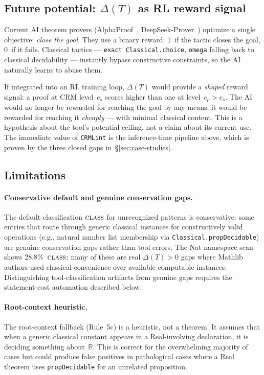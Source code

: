 \documentclass[12pt, a4paper]{article}
\theoremstyle{plain}
\theoremstyle{definition}
\theoremstyle{remark}
\newcommand{\CLASS}{\textsc{class}}
\newcommand{\CRMLint}{\texttt{CRMLint}}
\begin{document}
\subsection{Future potential: $\Delta(T)$ as RL reward signal}

Current AI theorem provers (AlphaProof~\cite{alphaproof},
DeepSeek-Prover~\cite{deepseek}) optimize a single objective:
\emph{close the goal}.  They use a binary reward: 1~if the tactic
closes the goal, 0~if it fails.  Classical tactics ---
\texttt{exact Classical.choice}, \texttt{omega} falling back to
classical decidability --- instantly bypass constructive constraints,
so the AI naturally learns to abuse them.

If integrated into an RL training loop, $\Delta(T)$ would provide a
\emph{shaped} reward signal: a proof at CRM level~$c_s$ scores
higher than one at level~$c_p > c_s$.  The AI would no longer be
rewarded for reaching the goal by any means; it would be rewarded
for reaching it \emph{cheaply} --- with minimal classical content.
This is a hypothesis about the tool's potential ceiling, not a
claim about its current use.  The immediate value of \CRMLint{} is
the inference-time pipeline above, which is proven by the three
closed gaps in~\S\ref{sec:case-studies}.

\subsection{Limitations}

\paragraph{Conservative default and genuine conservation gaps.}
The default classification $\CLASS$ for unrecognized patterns
is conservative: some entries that route through generic classical
instances for constructively valid operations (e.g., natural number
list membership via \texttt{Classical.propDecidable}) are genuine
conservation gaps rather than tool errors.  The Nat namespace scan
shows 28.8\%~$\CLASS$; many of these are real $\Delta(T) > 0$ gaps
where Mathlib authors used classical convenience over available
computable instances.  Distinguishing tool-classification artifacts
from genuine gaps requires the statement-cost automation described
below.

\paragraph{Root-context heuristic.}
The root-context fallback (Rule~5c) is a heuristic, not a theorem.
It assumes that when a generic classical constant appears in a
Real-involving declaration, it is deciding something about~$\mathbb{R}$.
This is correct for the overwhelming majority of cases but could
produce false positives in pathological cases where a Real theorem
uses \texttt{propDecidable} for an unrelated proposition.
\end{document}
